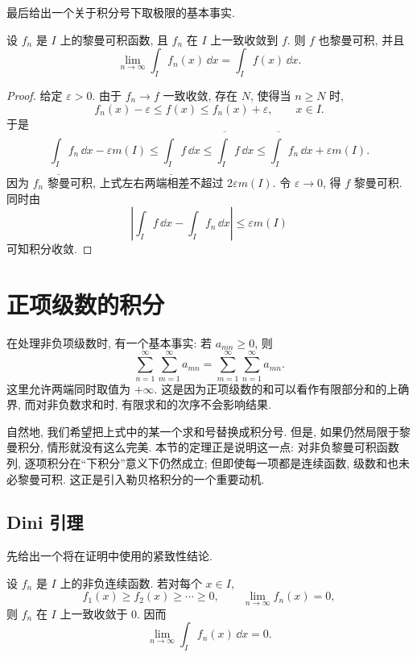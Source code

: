 最后给出一个关于积分号下取极限的基本事实.

\begin{thm}
	设 \(f_n\) 是 \(I\) 上的黎曼可积函数, 且 \(f_n\) 在 \(I\) 上一致收敛到
	\(f\). 则 \(f\) 也黎曼可积, 并且
	\[
	\lim_{n\to\infty}\int_I f_n(x)\,\dd x
	=\int_I f(x)\,\dd x.
	\]
\end{thm}

\begin{proof}
	给定 \(\varepsilon>0\). 由于 \(f_n\to f\) 一致收敛, 存在 \(N\), 使得当
	\(n\geq N\) 时,
	\[
	f_n(x)-\varepsilon\leq f(x)\leq f_n(x)+\varepsilon,
	\qquad x\in I.
	\]
	于是
	\[
	\underline{\int_I} f_n\,\dd x-\varepsilon m(I)
	\leq
	\underline{\int_I} f\,\dd x
	\leq
	\overline{\int_I} f\,\dd x
	\leq
	\overline{\int_I} f_n\,\dd x+\varepsilon m(I).
	\]
	因为 \(f_n\) 黎曼可积, 上式左右两端相差不超过 \(2\varepsilon m(I)\).
	令 \(\varepsilon\to0\), 得 \(f\) 黎曼可积. 同时由
	\[
	\left|\int_I f\,\dd x-\int_I f_n\,\dd x\right|
	\leq \varepsilon m(I)
	\]
	可知积分收敛.
\end{proof}

\clearpage

\section{正项级数的积分}
\label{sec:positive-series-integration}

在处理非负项级数时, 有一个基本事实: 若 \(a_{mn}\geq 0\), 则
\[
\sum_{n=1}^{\infty}\sum_{m=1}^{\infty}a_{mn}
=
\sum_{m=1}^{\infty}\sum_{n=1}^{\infty}a_{mn}.
\]
这里允许两端同时取值为 \(+\infty\). 这是因为正项级数的和可以看作有限部分和的上确界, 而对非负数求和时, 有限求和的次序不会影响结果.

自然地, 我们希望把上式中的某一个求和号替换成积分号. 但是, 如果仍然局限于黎曼积分, 情形就没有这么完美. 本节的定理正是说明这一点: 对非负黎曼可积函数列, 逐项积分在“下积分”意义下仍然成立; 但即使每一项都是连续函数, 级数和也未必黎曼可积. 这正是引入勒贝格积分的一个重要动机.

\subsection{Dini 引理}

先给出一个将在证明中使用的紧致性结论.

\begin{lem}[Dini 引理]
	\label{lem:dini-riemann}
	设 \(f_n\) 是 \(I\) 上的非负连续函数. 若对每个 \(x\in I\),
	\[
	f_1(x)\geq f_2(x)\geq \cdots \geq 0,
	\qquad
	\lim_{n\to\infty}f_n(x)=0,
	\]
	则 \(f_n\) 在 \(I\) 上一致收敛于 \(0\). 因而
	\[
	\lim_{n\to\infty}\int_I f_n(x)\,\dd x=0.
	\]
\end{lem}

